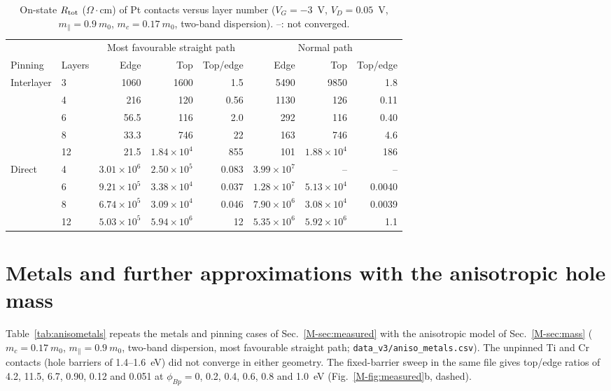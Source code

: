 \documentclass[11pt]{article}
\providecommand{\ohmcm}{\ensuremath{\Omega\cdot\mathrm{cm}}}
\providecommand{\ohmcm}{\ensuremath{\Omega\cdot\mathrm{cm}}}
\begin{document}
\begin{table}[!htbp]
\centering
\caption{On-state $R_{\rm tot}$ (\ohmcm) of Pt contacts versus layer number ($V_G=-3$~V, $V_D=0.05$~V, $m_\parallel=0.9~m_0$, $m_c=0.17~m_0$, two-band dispersion). --: not converged.}
\label{tab:thickdir}\small
\begin{tabular}{llrrrrrr}
\toprule
 & & \multicolumn{3}{c}{Most favourable straight path} & \multicolumn{3}{c}{Normal path} \\
Pinning & Layers & Edge & Top & Top/edge & Edge & Top & Top/edge \\
\midrule
Interlayer & 3 & 1060 & 1600 & 1.5 & 5490 & 9850 & 1.8 \\
 & 4 & 216 & 120 & 0.56 & 1130 & 126 & 0.11 \\
 & 6 & 56.5 & 116 & 2.0 & 292 & 116 & 0.40 \\
 & 8 & 33.3 & 746 & 22 & 163 & 746 & 4.6 \\
 & 12 & 21.5 & $1.84\times10^4$ & 855 & 101 & $1.88\times10^4$ & 186 \\
Direct & 4 & $3.01\times10^6$ & $2.50\times10^5$ & 0.083 & $3.99\times10^7$ & -- & -- \\
 & 6 & $9.21\times10^5$ & $3.38\times10^4$ & 0.037 & $1.28\times10^7$ & $5.13\times10^4$ & 0.0040 \\
 & 8 & $6.74\times10^5$ & $3.09\times10^4$ & 0.046 & $7.90\times10^6$ & $3.08\times10^4$ & 0.0039 \\
 & 12 & $5.03\times10^5$ & $5.94\times10^6$ & 12 & $5.35\times10^6$ & $5.92\times10^6$ & 1.1 \\
\bottomrule
\end{tabular}
\end{table}

\section{Metals and further approximations with the anisotropic hole mass}
\label{sec:anisometals}
Table~\ref{tab:anisometals} repeats the metals and pinning cases of Sec.~\ref{M-sec:measured} with the anisotropic model of Sec.~\ref{M-sec:mass} ($m_c=0.17~m_0$, $m_\parallel=0.9~m_0$, two-band dispersion, most favourable straight path; \texttt{data\_v3/aniso\_metals.csv}). The unpinned Ti and Cr contacts (hole barriers of 1.4--1.6~eV) did not converge in either geometry. The fixed-barrier sweep in the same file gives top/edge ratios of 4.2, 11.5, 6.7, 0.90, 0.12 and 0.051 at $\phi_{Bp}=0$, 0.2, 0.4, 0.6, 0.8 and 1.0~eV (Fig.~\ref{M-fig:measured}b, dashed).
\end{document}
